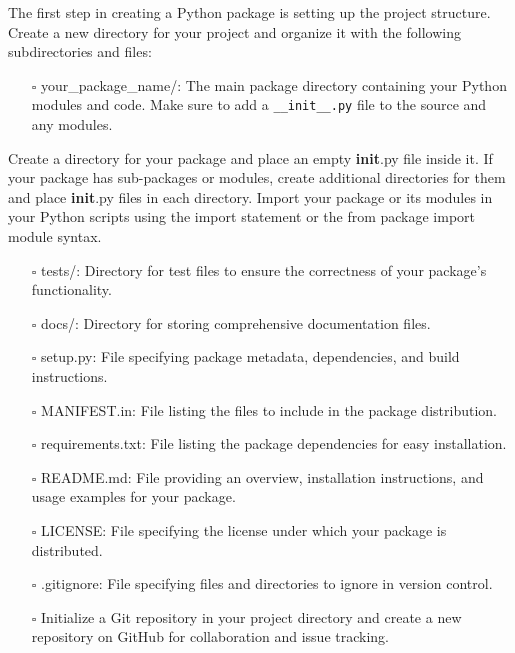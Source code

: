 \documentclass[
  letterpaper,
  DIV=11,
  numbers=noendperiod]{scrreprt}
\providecommand{\tightlist}{%
  \setlength{\itemsep}{0pt}\setlength{\parskip}{0pt}}\usepackage{longtable,booktabs,array}
\begin{document}
The first step in creating a Python package is setting up the project
structure. Create a new directory for your project and organize it with
the following subdirectories and files:

\begin{itemize}
\tightlist
\item[$\square$]
  your\_package\_name/: The main package directory containing your
  Python modules and code. Make sure to add a \texttt{\_\_init\_\_.py}
  file to the source and any modules.
\end{itemize}

\begin{tcolorbox}[enhanced jigsaw, colback=white, opacitybacktitle=0.6, coltitle=black, left=2mm, breakable, bottomtitle=1mm, toptitle=1mm, toprule=.15mm, colframe=quarto-callout-tip-color-frame, titlerule=0mm, title=\textcolor{quarto-callout-tip-color}{\faLightbulb}\hspace{0.5em}{\textbf{init}.py}, colbacktitle=quarto-callout-tip-color!10!white, rightrule=.15mm, bottomrule=.15mm, arc=.35mm, opacityback=0, leftrule=.75mm]

Create a directory for your package and place an empty \textbf{init}.py
file inside it. If your package has sub-packages or modules, create
additional directories for them and place \textbf{init}.py files in each
directory. Import your package or its modules in your Python scripts
using the import statement or the from package import module syntax.

\end{tcolorbox}

\begin{itemize}
\tightlist
\item[$\square$]
  tests/: Directory for test files to ensure the correctness of your
  package's functionality.
\item[$\square$]
  docs/: Directory for storing comprehensive documentation files.
\item[$\square$]
  setup.py: File specifying package metadata, dependencies, and build
  instructions.
\item[$\square$]
  MANIFEST.in: File listing the files to include in the package
  distribution.
\item[$\square$]
  requirements.txt: File listing the package dependencies for easy
  installation.
\item[$\square$]
  README.md: File providing an overview, installation instructions, and
  usage examples for your package.
\item[$\square$]
  LICENSE: File specifying the license under which your package is
  distributed.
\item[$\square$]
  .gitignore: File specifying files and directories to ignore in version
  control.
\item[$\square$]
  Initialize a Git repository in your project directory and create a new
  repository on GitHub for collaboration and issue tracking.
\end{itemize}
\end{document}
